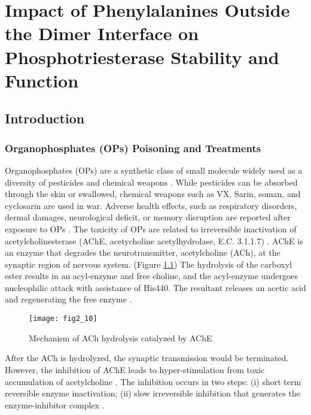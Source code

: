 \chapter{Impact of Phenylalanines Outside the Dimer Interface on
Phosphotriesterase Stability and Function}
\label{chap:dimer}
\begin{refsection}

\section{Introduction}

\subsection{Organophosphates (OPs) Poisoning and Treatments}

Organophosphates (OPs) are a synthetic class of small molecule widely used as a
diversity of pesticides and chemical weapons \cite{Perezgasga2012,Ross2013b}.
While pesticides can be absorbed through the skin or swallowed, chemical
weapons such as VX, Sarin, soman, and cyclosarin are used in war.  Adverse
health effects, such as respiratory disorders, dermal damages, neurological
deficit, or memory disruption are reported after exposure to OPs
\cite{Ross2013b}. The toxicity of OPs are related to irreversible inactivation
of acetylcholinesterase (AChE, acetycholine acetylhydrolase, E.C. 3.1.1.7)
\cite{Ross2013b}. AChE is an enzyme that degrades the neurotransmitter,
acetylcholine (ACh), at the synaptic region of nervous system. (Figure
\ref{fig:ache}) The hydrolysis of the carboxyl ester results in an acyl-enzyme
and free choline, and the acyl-enzyme undergoes nucleophilic attack with
assistance of His440. The resultant releases an acetic acid and regenerating
the free enzyme \cite{Ross2013b}.
\begin{figure}[htbp] \centering \texttt{[image: fig2\_10]}
    \caption[Mechanism of ACh hydrolysis catalyzed by AChE.]{Mechanism of ACh
        hydrolysis catalyzed by AChE \cite{Ross2013b}} \label{fig:ache}
\end{figure}

After the ACh is hydrolyzed, the synaptic transmission would be terminated.
However, the inhibition of AChE leads to hyper-stimulation from toxic
accumulation of acetylcholine \cite{Soreq2001}. The inhibition occurs in two
steps: (i) short term reversible enzyme inactivation; (ii) slow irreversible
inhibition that generates the enzyme-inhibitor complex \cite{Ross2013b}.


\end{refsection}
